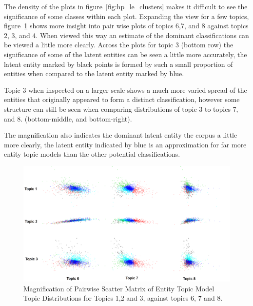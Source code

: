 \documentclass[10pt]{report}
\begin{document}
\clearpage
The density of the plots in figure~\ref{fig:hp_le_clusters} makes it difficult to see the significance of some classes within each plot. Expanding the view for a few topics, figure~\ref{fig:hp_le_cluster_zoom} shows more insight into pair wise plots of topics 6,7, and 8 against topics 2, 3, and 4. When viewed this way an estimate of the dominant classifications can be viewed a little more clearly. Across the plots for topic 3 (bottom row) the significance of some of the latent entities can be seen a little more accurately, the latent entity marked by black points is formed by such a small proportion of entities when compared to the latent entity marked by blue.

Topic 3 when inspected on a larger scale shows a much more varied spread of the entities that originally appeared to form a distinct classification, however some structure can still be seen when comparing distributions of topic 3 to topics 7, and 8. (bottom-middle, and bottom-right).

The magnification also indicates the dominant latent entity the corpus a little more clearly, the latent entity indicated by blue is an approximation for far more entity topic models than the other potential classifications. 
\begin{figure}[h!]
  \centering
  \includegraphics[scale=0.14]{hp_full_le_clusters_zoom}
\caption{Magnification of Pairwise Scatter Matrix of Entity Topic Model Topic Distributions for Topics 1,2 and 3, against topics 6, 7 and 8.\label{fig:hp_le_cluster_zoom}}
\end{figure}

\clearpage
\end{document}
